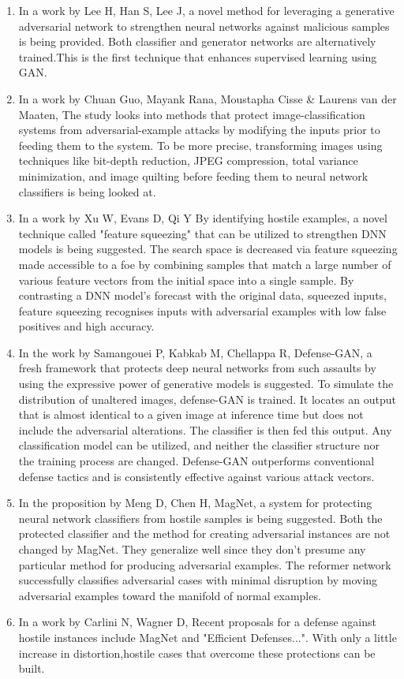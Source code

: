 \documentclass[ 12pt,a4paper,twocolumn,fleqn]{article}
\begin{document}
\begin{enumerate}
    \item In a work by Lee H, Han S, Lee J, a novel method for leveraging a generative adversarial network to strengthen neural networks against malicious samples is being provided. Both classifier and generator networks are alternatively trained.This is the first technique that enhances supervised learning using GAN.
    \item In a work by Chuan Guo, Mayank Rana, Moustapha Cisse & Laurens van der Maaten, The study looks into methods that protect image-classification systems from adversarial-example attacks by modifying the inputs prior to feeding them to the system. To be more precise, transforming images using techniques like bit-depth reduction, JPEG compression, total variance minimization, and image quilting before feeding them to neural network classifiers is being looked at.
    \item In a work by Xu W, Evans D, Qi Y By identifying hostile examples, a novel technique called "feature squeezing" that can be utilized to strengthen DNN models is being suggested. The search space is decreased via feature squeezing made accessible to a foe by combining samples that match a large number of various feature vectors from the initial space into a single sample. By contrasting a DNN model's forecast with the original data, squeezed inputs, feature squeezing recognises inputs with adversarial examples with low false positives and high accuracy.
    \item In the work by Samangouei P, Kabkab M, Chellappa R, Defense-GAN, a fresh framework that protects deep neural networks from such assaults by using the expressive power of generative models is suggested. To simulate the distribution of unaltered images, defense-GAN is trained. It locates an output that is almost identical to a given image at inference time but does not include the adversarial alterations. The classifier is then fed this output. Any classification model can be utilized, and neither the classifier structure nor the training process are changed. Defense-GAN outperforms conventional defense tactics and is consistently effective against various attack vectors.
    \item In the proposition by Meng D, Chen H, MagNet, a system for protecting neural network classifiers from hostile samples is being suggested. Both the protected classifier and the method for creating adversarial instances are not changed by MagNet. They generalize well since they don't presume any particular method for producing adversarial examples. The reformer network successfully classifies adversarial cases with minimal disruption by moving adversarial examples toward the manifold of normal examples.
    \item In a work by Carlini N, Wagner D, Recent proposals for a defense against hostile instances include MagNet and "Efficient Defenses...". With only a little increase in distortion,hostile cases that overcome these protections can be built.
\end{enumerate}
\end{document}
